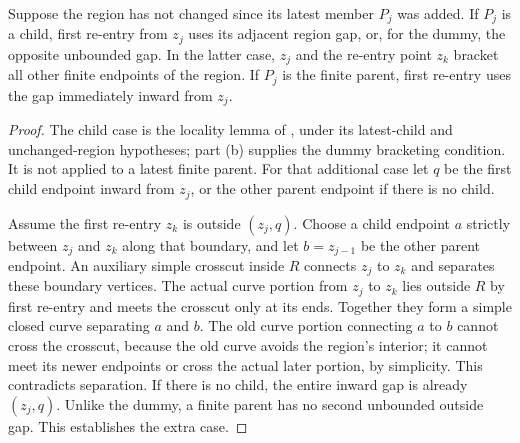 \begin{lemma}
\label{lem:proof-reentry}
Suppose the region has not changed since its latest member $P_j$ was added.
If $P_j$ is a child, first re-entry from $z_j$ uses its adjacent region gap,
or, for the dummy, the opposite unbounded gap. In the latter case, $z_j$
and the re-entry point $z_k$ bracket all other finite endpoints of the
region. If $P_j$ is the finite parent, first re-entry uses the gap
immediately inward from $z_j$.
\end{lemma}
\begin{proof}
The child case is the locality lemma of
\textcite[p.~88, locality lemma (a)--(b), Figs.~3--4]{fung1990simplified},
under its latest-child and unchanged-region hypotheses; part (b) supplies
the dummy bracketing condition. It is not applied to a latest finite parent.
For that additional case let $q$ be the first child endpoint inward from
$z_j$, or the other parent endpoint if there is no child.

Assume the first re-entry $z_k$ is outside $(z_j,q)$. Choose a child endpoint
$a$ strictly between $z_j$ and $z_k$ along that boundary, and let
$b=z_{j-1}$ be the other parent endpoint. An auxiliary simple crosscut
inside $R$ connects $z_j$ to $z_k$ and separates these boundary vertices.
The actual curve portion from $z_j$ to $z_k$ lies outside $R$ by first
re-entry and meets the crosscut only at its ends. Together they form a simple
closed curve separating $a$ and $b$. The old curve portion connecting $a$
to $b$ cannot cross the crosscut, because the old curve avoids the region's
interior; it cannot meet its newer endpoints or cross the actual later
portion, by simplicity. This contradicts separation. If there is no child,
the entire inward gap is already $(z_j,q)$. Unlike the dummy, a finite parent
has no second unbounded outside gap. This establishes the extra case.
\end{proof}


